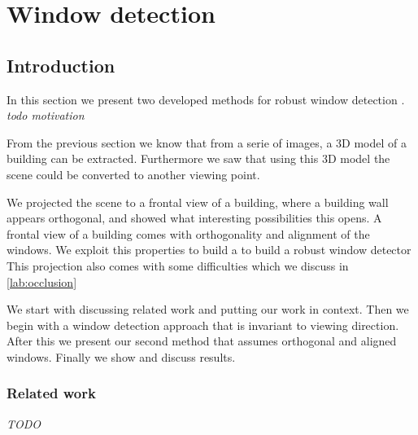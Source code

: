 





%
%




\section{Window detection}


\label{chap:windowDetection}
\subsection{Introduction}

In this section we present two developed methods for robust window detection .
\emph{ todo motivation}

From the previous section we know that from a serie of images, a 3D model of a
building can be extracted. Furthermore we saw that using this 3D model the
scene could be converted to another viewing point. 

We projected the scene to a frontal view of a building, where a building wall appears
orthogonal, and showed what interesting possibilities this opens.
A frontal view of a building comes with orthogonality and alignment of the
windows. We exploit this properties to build a to build a robust window detector
This projection also comes with some difficulties which we discuss in \ref{lab:occlusion}

We start with discussing related work and putting our work in context.  Then we
begin with a window detection approach that is invariant to viewing direction.
After this we present our second method that assumes orthogonal and aligned
windows.  Finally we show and discuss results. 


\subsubsection{Related work}
\emph{TODO}

